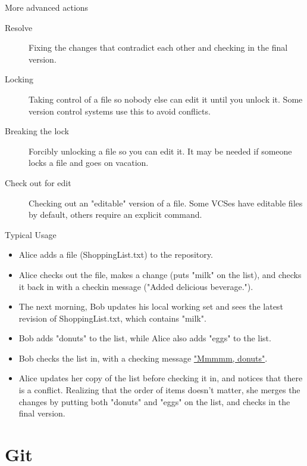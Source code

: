 \documentclass[aspectratio=169]{beamer}
\begin{document}
\begin{frame}{More advanced actions}

\begin{description}
\item[Resolve] Fixing the changes that contradict each other and
  checking in the final version.
\item[Locking] Taking control of a file so nobody else can edit
  it until you unlock it. Some version control systems use this to avoid
  conflicts.
\item[Breaking the lock] Forcibly unlocking a file so you can
  edit it. It may be needed if someone locks a file and goes on
  vacation.
\item[Check out for edit] Checking out an "editable" version of a
  file. Some VCSes have editable files by default, others require an
  explicit command.
\end{description}

\end{frame}

\begin{frame}{Typical Usage}

\begin{itemize}
\item
  Alice adds a file (ShoppingList.txt) to the repository.
\item
  Alice checks out the file, makes a change (puts "milk" on the list),
  and checks it back in with a checkin message ("Added delicious
  beverage.").
\item
  The next morning, Bob updates his local working set and sees the
  latest revision of ShoppingList.txt, which contains "milk".
\item
  Bob adds "donuts" to the list, while Alice also adds "eggs" to the
  list.
\item
  Bob checks the list in, with a checking message
  \href{https://www.youtube.com/watch?v=8-4P1WPE-Qg}{"Mmmmm, donuts"}.
\item
  Alice updates her copy of the list before checking it in, and notices
  that there is a conflict. Realizing that the order of items doesn't
  matter, she merges the changes by putting both "donuts" and "eggs" on
  the list, and checks in the final version.
\end{itemize}

\end{frame}

\section{Git}
\end{document}
